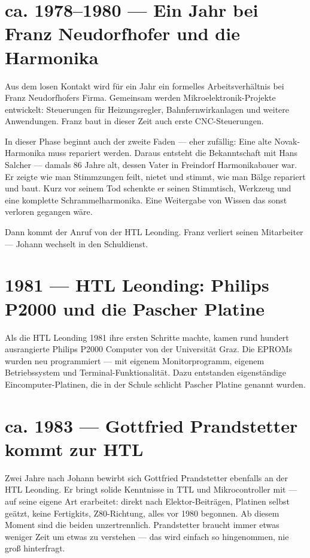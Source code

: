 \documentclass[11pt]{report}
\begin{document}
\section{ca. 1978--1980 --- Ein Jahr bei Franz Neudorfhofer und die Harmonika}

Aus dem losen Kontakt wird für ein Jahr ein formelles Arbeitsverhältnis bei Franz Neudorfhofers Firma. Gemeinsam werden Mikroelektronik-Projekte entwickelt: Steuerungen für Heizungsregler, Bahnfernwirkanlagen und weitere Anwendungen. Franz baut in dieser Zeit auch erste CNC-Steuerungen.

In dieser Phase beginnt auch der zweite Faden --- eher zufällig: Eine alte Novak-Harmonika muss repariert werden. Daraus entsteht die Bekanntschaft mit Hans Salcher --- damals 86 Jahre alt, dessen Vater in Freindorf Harmonikabauer war. Er zeigte wie man Stimmzungen feilt, nietet und stimmt, wie man Bälge repariert und baut. Kurz vor seinem Tod schenkte er seinen Stimmtisch, Werkzeug und eine komplette Schrammelharmonika. Eine Weitergabe von Wissen das sonst verloren gegangen wäre.

Dann kommt der Anruf von der HTL Leonding. Franz verliert seinen Mitarbeiter --- Johann wechselt in den Schuldienst.

\section{1981 --- HTL Leonding: Philips P2000 und die Pascher Platine}

Als die HTL Leonding 1981 ihre ersten Schritte machte, kamen rund hundert ausrangierte Philips P2000 Computer von der Universität Graz. Die EPROMs wurden neu programmiert --- mit eigenem Monitorprogramm, eigenem Betriebssystem und Terminal-Funktionalität. Dazu entstanden eigenständige Eincomputer-Platinen, die in der Schule schlicht \glqq Pascher Platine\grqq{} genannt wurden.

\section{ca. 1983 --- Gottfried Prandstetter kommt zur HTL}

Zwei Jahre nach Johann bewirbt sich Gottfried Prandstetter ebenfalls an der HTL Leonding. Er bringt solide Kenntnisse in TTL und Mikrocontroller mit --- auf seine eigene Art erarbeitet: direkt nach Elektor-Beiträgen, Platinen selbst geätzt, keine Fertigkits, Z80-Richtung, alles vor 1980 begonnen. Ab diesem Moment sind die beiden unzertrennlich. Prandstetter braucht immer etwas weniger Zeit um etwas zu verstehen --- das wird einfach so hingenommen, nie groß hinterfragt.
\end{document}
